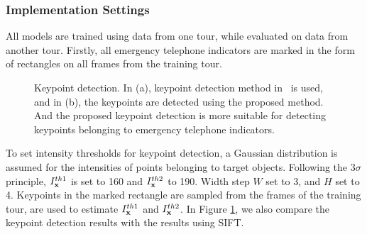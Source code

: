 \subsubsection{Implementation Settings} All models are trained using data from one tour, while evaluated on data from another tour. Firstly, all emergency telephone indicators are marked in the form of rectangles on all frames from the training tour.

\begin{figure}
\centering
{}
\caption[Keypoint detection comparison]{Keypoint detection. In (a), keypoint detection method in~\citep{o12} is used, and in (b), the keypoints are detected using the proposed method. And the proposed keypoint detection is more suitable for detecting keypoints belonging to emergency telephone indicators.}
\label{ex1:va}
\end{figure}


To set intensity thresholds for keypoint detection, a Gaussian distribution is assumed for the intensities of points belonging to target objects. Following the $3\sigma$ principle, $I^{th1}_{\bf{x}}$ is set to 160 and $I^{th2}_{\bf{x}}$ to 190. Width step $W$ set to 3, and $H$ set to 4. Keypoints in the marked rectangle are sampled from the frames of the training tour, are used to estimate $I^{th1}_{\bf{x}}$  and $I^{th2}_{\bf{x}}$.   In Figure \ref{ex1:va}, we also compare the keypoint detection results with the results using SIFT.


